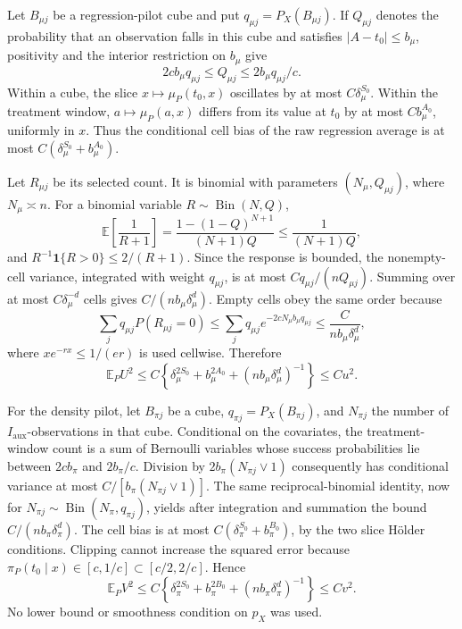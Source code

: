Let \(B_{\mu j}\) be a regression-pilot cube and put \(q_{\mu j}=P_X(B_{\mu j})\). If \(Q_{\mu j}\) denotes the probability that an observation falls in this cube and satisfies \(\lvert A-t_0\rvert\le b_\mu\), positivity and the interior restriction on \(b_\mu\) give
\[
2cb_\mu q_{\mu j}\le Q_{\mu j}\le 2b_\mu q_{\mu j}/c.
\]
Within a cube, the slice \(x\mapsto\mu_P(t_0,x)\) oscillates by at most \(C\delta_\mu^{S_0}\). Within the treatment window, \(a\mapsto\mu_P(a,x)\) differs from its value at \(t_0\) by at most \(Cb_\mu^{A_0}\), uniformly in \(x\). Thus the conditional cell bias of the raw regression average is at most \(C(\delta_\mu^{S_0}+b_\mu^{A_0})\).

Let \(R_{\mu j}\) be its selected count. It is binomial with parameters \((N_\mu,Q_{\mu j})\), where \(N_\mu\asymp n\). For a binomial variable \(R\sim\operatorname{Bin}(N,Q)\),
\[
\mathbb E\left[\frac{1}{R+1}\right]
=\frac{1-(1-Q)^{N+1}}{(N+1)Q}
\le\frac{1}{(N+1)Q},
\]
and \(R^{-1}\mathbf 1\{R>0\}\le2/(R+1)\). Since the response is bounded, the nonempty-cell variance, integrated with weight \(q_{\mu j}\), is at most \(Cq_{\mu j}/(nQ_{\mu j})\). Summing over at most \(C\delta_\mu^{-d}\) cells gives \(C/(nb_\mu\delta_\mu^d)\). Empty cells obey the same order because
\[
\sum_jq_{\mu j}P(R_{\mu j}=0)
\le\sum_jq_{\mu j}e^{-2cN_\mu b_\mu q_{\mu j}}
\le \frac{C}{nb_\mu\delta_\mu^d},
\]
where \(xe^{-rx}\le1/(er)\) is used cellwise. Therefore
\[
\mathbb E_PU^2\le C\left\{\delta_\mu^{2S_0}+b_\mu^{2A_0}+(nb_\mu\delta_\mu^d)^{-1}\right\}\le Cu^2.
\]

For the density pilot, let \(B_{\pi j}\) be a cube, \(q_{\pi j}=P_X(B_{\pi j})\), and \(N_{\pi j}\) the number of \(I_{\mathrm{aux}}\)-observations in that cube. Conditional on the covariates, the treatment-window count is a sum of Bernoulli variables whose success probabilities lie between \(2cb_\pi\) and \(2b_\pi/c\). Division by \(2b_\pi(N_{\pi j}\vee1)\) consequently has conditional variance at most \(C/[b_\pi(N_{\pi j}\vee1)]\). The same reciprocal-binomial identity, now for \(N_{\pi j}\sim\operatorname{Bin}(N_\pi,q_{\pi j})\), yields after integration and summation the bound \(C/(nb_\pi\delta_\pi^d)\). The cell bias is at most \(C(\delta_\pi^{S_0}+b_\pi^{B_0})\), by the two slice Hölder conditions. Clipping cannot increase the squared error because \(\pi_P(t_0\mid x)\in[c,1/c]\subset[c/2,2/c]\). Hence
\[
\mathbb E_PV^2\le C\left\{\delta_\pi^{2S_0}+b_\pi^{2B_0}+(nb_\pi\delta_\pi^d)^{-1}\right\}\le Cv^2.
\]
No lower bound or smoothness condition on \(p_X\) was used.